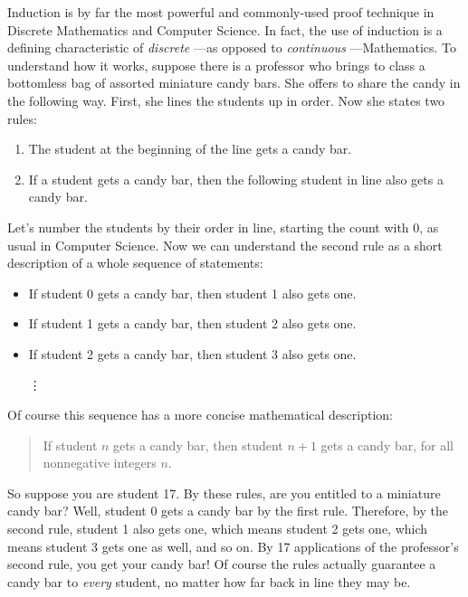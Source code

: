 
Induction is by far the most powerful and commonly-used proof technique in
Discrete Mathematics and Computer Science.  In fact, the use of induction
is a defining characteristic of \emph{discrete} ---as opposed to
\emph{continuous} ---Mathematics.
%
To understand how it works, suppose there is a professor who brings
to class a bottomless bag of assorted miniature candy bars.  She offers to
share the candy in the following way.  First, she lines the students up in
order.  Now she states two rules:

\begin{enumerate}
\item The student at the beginning of the line gets a candy bar.
\item If a student gets a candy bar, then the following student in line
  also gets a candy bar.
\end{enumerate}
%
Let's number the students by their order in line, starting the count with
0, as usual in Computer Science.  Now we can understand the second rule as
a short description of a whole sequence of statements:
%
\begin{itemize}
\item If student 0 gets a candy bar, then student 1 also gets one.
\item If student 1 gets a candy bar, then student 2 also gets one.
\item If student 2 gets a candy bar, then student 3 also gets one.

\hspace{1.2in} \vdots
\end{itemize}
%
Of course this sequence has a more concise mathematical description:
\begin{quote}
  If student $n$ gets a candy bar, then student $n+1$ gets a
  candy bar, for all nonnegative integers $n$.
\end{quote}
So suppose you are student 17.  By these rules, are you entitled to a
miniature candy bar?  Well, student 0 gets a candy bar by the first rule.
Therefore, by the second rule, student 1 also gets one, which means
student 2 gets one, which means student 3 gets one as well, and so on.  By
17 applications of the professor's second rule, you get your candy bar!
Of course the rules actually guarantee a candy bar to \emph{every}
student, no matter how far back in line they may be.


